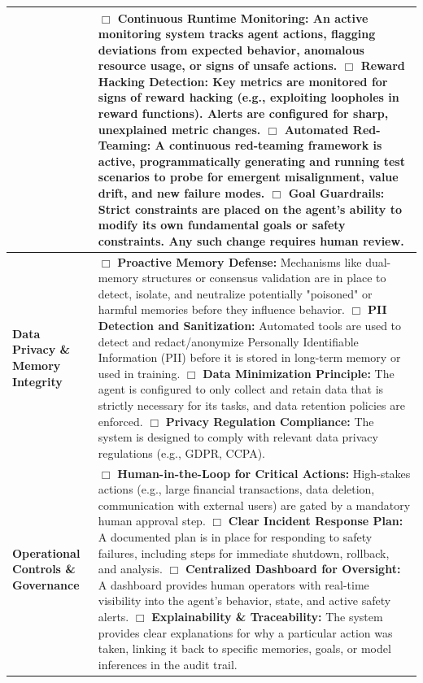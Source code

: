 \documentclass[10pt]{article} %
\begin{document}
\begin{table}[h!]
\begin{tabularx}{\textwidth}{|>{\raggedright\arraybackslash}p{3cm}|X|}
    & $\Box$ \textbf{Continuous Runtime Monitoring:} An active monitoring system tracks agent actions, flagging deviations from expected behavior, anomalous resource usage, or signs of unsafe actions. \newline
    $\Box$ \textbf{Reward Hacking Detection:} Key metrics are monitored for signs of reward hacking (e.g., exploiting loopholes in reward functions). Alerts are configured for sharp, unexplained metric changes. \newline
    $\Box$ \textbf{Automated Red-Teaming:} A continuous red-teaming framework is active, programmatically generating and running test scenarios to probe for emergent misalignment, value drift, and new failure modes. \newline
    $\Box$ \textbf{Goal Guardrails:} Strict constraints are placed on the agent's ability to modify its own fundamental goals or safety constraints. Any such change requires human review. \\ \hline
\textbf{Data Privacy \& Memory Integrity}
    & $\Box$ \textbf{Proactive Memory Defense:} Mechanisms like dual-memory structures or consensus validation are in place to detect, isolate, and neutralize potentially "poisoned" or harmful memories before they influence behavior. \newline
    $\Box$ \textbf{PII Detection and Sanitization:} Automated tools are used to detect and redact/anonymize Personally Identifiable Information (PII) before it is stored in long-term memory or used in training. \newline
    $\Box$ \textbf{Data Minimization Principle:} The agent is configured to only collect and retain data that is strictly necessary for its tasks, and data retention policies are enforced. \newline
    $\Box$ \textbf{Privacy Regulation Compliance:} The system is designed to comply with relevant data privacy regulations (e.g., GDPR, CCPA). \\ \hline
\textbf{Operational Controls \& Governance}
    & $\Box$ \textbf{Human-in-the-Loop for Critical Actions:} High-stakes actions (e.g., large financial transactions, data deletion, communication with external users) are gated by a mandatory human approval step. \newline
    $\Box$ \textbf{Clear Incident Response Plan:} A documented plan is in place for responding to safety failures, including steps for immediate shutdown, rollback, and analysis. \newline
    $\Box$ \textbf{Centralized Dashboard for Oversight:} A dashboard provides human operators with real-time visibility into the agent's behavior, state, and active safety alerts. \newline
    $\Box$ \textbf{Explainability \& Traceability:} The system provides clear explanations for why a particular action was taken, linking it back to specific memories, goals, or model inferences in the audit trail. \\ \hline
\end{tabularx}
\end{table}
\end{document}
